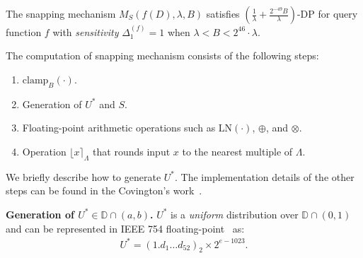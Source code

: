 \begin{theorem}
    The snapping mechanism $M_{S}\left(f\left(D\right),\lambda,B\right)$ satisfies $\left(\frac{1}{\lambda}+\frac{2^{-49}B}{\lambda}\right) $-DP for query function $f$ with \textit{sensitivity} $\Delta _1^{\left(f\right) } =1$ when $\lambda<B<2^{46}\cdot\lambda$.
\end{theorem}



The computation of snapping mechanism consists of the following steps:
\begin{enumerate}
    \label{enu:snappingSteps}
    \item $\text{clamp}_B\left(\cdot\right) $.
    \item Generation of $U^{*}$ and $S$.
    \item Floating-point arithmetic operations such as $\text{LN}\left(\cdot\right) $, $\oplus$, and $\otimes $.
    \item Operation $\lfloor x\rceil_{\Lambda}$ that rounds input $x$ to the nearest multiple of $\Lambda $.
\end{enumerate}
We briefly describe how to generate $U^{*}$. The implementation details of the other steps can be found in the Covington's work~\cite{Covington2019}.



\textbf{Generation of $U^{*}\in\mathbb{D} \cap \left(a,b\right)  $.}
$U^{*}$ is a \textit{uniform} distribution over $\mathbb{D} \cap \left(0,1\right) $ and can be represented in IEEE 754 floating-point~\cite{IEEE754_2019} as:
\begin{equation}
    \begin{split}
        U^{*}=\left(1.d_{1}\ldots d_{52}\right)_{2}\times2^{e-1023}.
    \end{split}
\end{equation}

